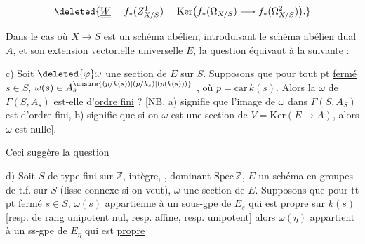 

\[
\deleted{\underline{\underline{W}}=f_*(Z^1_{X/S})=\operatorname{Ker}\bigl(f_*(\Omega_{X/S})\longrightarrow f_*(\Omega^2_{X/S})\bigr).}
\]

Dans le cas où $X\to S$ est un schéma abélien, introduisant le schéma abélien dual $A$, et son extension vectorielle universelle $E$, la question  équivaut à la suivante : 



c) Soit $\deleted{\varphi}\omega$ une section de $E$ sur $S$. Supposons que pour tout pt \uline{fermé} $s\in S$, $\omega(s)\in A_s^{\unsure{(p/k(s))|(p/k_s)|(p(k(s)))}}$ , où $p=\mathrm{car}\,k(s)$. Alors la  $\omega$ de $\Gamma(S,A_s)$ est-elle d'\uline{ordre fini} ? [NB. a) signifie que l'image de $\omega$ dans $\Gamma(S,A_S)$ est d'ordre fini, b) signifie que si on  $\omega$ est une section de $V=\mathrm{Ker}(E\to A)$, alors $\omega$ est nulle].

Ceci suggère la question

d) Soit $S$ de type fini sur $\mathbb Z$, intègre, , dominant $\mathrm{Spec}\,\mathbb Z$,  $E$ un schéma en groupes  de t.f. sur $S$ (lisse connexe si on veut\unsure{ !|}), $\omega$ une section de $E$. Supposons que pour tt pt fermé $s\in S$, $\omega(s)$ appartienne  à un sous-gpe de $E_s$ qui est \uline{propre}  sur $k(s)$ [resp.  de rang unipotent nul, resp.  affine, resp.  unipotent] alors $\omega(\eta)$ appartient à un ss-gpe de $E_\eta$ qui est \uline{propre}


